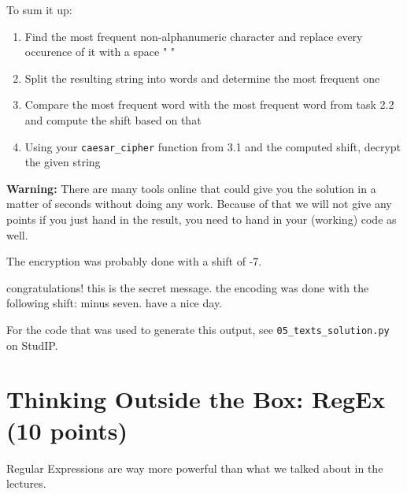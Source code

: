 \vspace{1em}

\noindent To sum it up:

\begin{enumerate}

    \item Find the most frequent non-alphanumeric character and replace every occurence of it with a space " "
    \item Split the resulting string into words and determine the most frequent one
    \item Compare the most frequent word with the most frequent word from task 2.2 and compute the shift based on that
    \item Using your \texttt{caesar\_cipher} function from 3.1 and the computed shift, decrypt the given string

\end{enumerate}

\noindent \textbf{Warning:} There are many tools online that could give you the solution in a matter of seconds without doing any work. Because of that we will not give any points if you just hand in the result, you need to hand in your (working) code as well.

\vspace{1em}

\begin{solution}

    \begin{outputcode}

The encryption was probably done with a shift of -7.

congratulations! this is the secret message. 
the encoding was done 
with the following shift: minus seven. have a nice day.

    \end{outputcode}

\noindent For the code that was used to generate this output, see \texttt{05\_texts\_solution.py} on StudIP.

\end{solution}

\section{Thinking Outside the Box: RegEx (10 points)}

Regular Expressions are way more powerful than what we talked about in the lectures. 

\vspace{1em}

